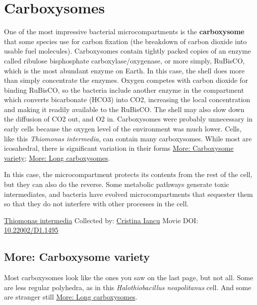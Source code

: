 \documentclass[]{tufte-book}
\begin{document}
\hypertarget{carboxysomes}{%
\section{Carboxysomes}\label{carboxysomes}}

One of the most impressive bacterial microcompartments is the \textbf{carboxysome} that some species use for carbon fixation (the breakdown of carbon dioxide into usable fuel molecules). Carboxysomes contain tightly packed copies of an enzyme called ribulose bisphosphate carboxylase/oxygenase, or more simply, RuBisCO, which is the most abundant enzyme on Earth. In this case, the shell does more than simply concentrate the enzymes. Oxygen competes with carbon dioxide for binding RuBisCO, so the bacteria include another enzyme in the compartment which converts bicarbonate (HCO3) into CO2, increasing the local concentration and making it readily available to the RuBisCO. The shell may also slow down the diffusion of CO2 out, and O2 in. Carboxysomes were probably unnecessary in early cells because the oxygen level of the environment was much lower. Cells, like this \emph{Thiomonas intermedia}, can contain many carboxysomes. While most are icosahedral, there is significant variation in their forms \protect\hyperlink{Carboxysome_variety}{More: Carboxysome variety}; \protect\hyperlink{Long_carboxysomes}{More: Long carboxysomes}.

In this case, the microcompartment protects its contents from the rest of the cell, but they can also do the reverse. Some metabolic pathways generate toxic intermediates, and bacteria have evolved microcompartments that sequester them so that they do not interfere with other processes in the cell.



\hypertarget{htmlwidget-70d70b9802ff75819c90}{}

\label{fig:4-7}\protect\hyperlink{tree}{Thiomonas intermedia} Collected by: \protect\hyperlink{cristina_iancu}{Cristina Iancu} Movie DOI: \href{https://doi.org/10.22002/D1.1495}{10.22002/D1.1495}

\hypertarget{Carboxysome_variety}{%
\subsection*{More: Carboxysome variety}\label{Carboxysome_variety}}

Most carboxysomes look like the ones you saw on the last page, but not all. Some are less regular polyhedra, as in this \emph{Halothiobacillus neapolitanus} cell. And some are stranger still \protect\hyperlink{Long_carboxysomes}{More: Long carboxysomes}.
\end{document}
